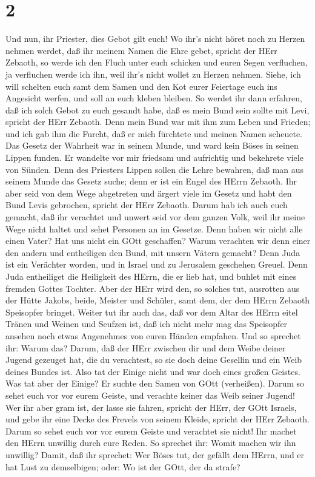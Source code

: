 \hypertarget{section-1}{%
\section{2}\label{section-1}}

 Und nun, ihr Priester, dies Gebot gilt euch! 
Wo ihr's nicht höret noch zu Herzen nehmen werdet, daß ihr meinem Namen
die Ehre gebet, spricht der HErr Zebaoth, so werde ich den Fluch unter
euch schicken und euren Segen verfluchen, ja verfluchen werde ich ihn,
weil ihr's nicht wollet zu Herzen nehmen.  Siehe, ich will
schelten euch samt dem Samen und den Kot eurer Feiertage euch ins
Angesicht werfen, und soll an euch kleben bleiben.  So
werdet ihr dann erfahren, daß ich solch Gebot zu euch gesandt habe, daß
es mein Bund sein sollte mit Levi, spricht der HErr Zebaoth.
 Denn mein Bund war mit ihm zum Leben und Frieden; und ich
gab ihm die Furcht, daß er mich fürchtete und meinen Namen scheuete.
 Das Gesetz der Wahrheit war in seinem Munde, und ward kein
Böses in seinen Lippen funden. Er wandelte vor mir friedsam und
aufrichtig und bekehrete viele von Sünden.  Denn des
Priesters Lippen sollen die Lehre bewahren, daß man aus seinem Munde das
Gesetz suche; denn er ist ein Engel des HErrn Zebaoth.  Ihr
aber seid von dem Wege abgetreten und ärgert viele im Gesetz und habt
den Bund Levis gebrochen, spricht der HErr Zebaoth.  Darum
hab ich auch euch gemacht, daß ihr verachtet und unwert seid vor dem
ganzen Volk, weil ihr meine Wege nicht haltet und sehet Personen an im
Gesetze.  Denn haben wir nicht alle einen Vater? Hat uns
nicht ein GOtt geschaffen? Warum verachten wir denn einer den andern und
entheiligen den Bund, mit unsern Vätern gemacht?  Denn Juda
ist ein Verächter worden, und in Israel und zu Jerusalem geschehen
Greuel. Denn Juda entheiliget die Heiligkeit des HErrn, die er lieb hat,
und buhlet mit eines fremden Gottes Tochter.  Aber der HErr
wird den, so solches tut, ausrotten aus der Hütte Jakobs, beide, Meister
und Schüler, samt dem, der dem HErrn Zebaoth Speisopfer bringet.
 Weiter tut ihr auch das, daß vor dem Altar des HErrn eitel
Tränen und Weinen und Seufzen ist, daß ich nicht mehr mag das Speisopfer
ansehen noch etwas Angenehmes von euren Händen empfahen. 
Und so sprechet ihr: Warum das? Darum, daß der HErr zwischen dir und dem
Weibe deiner Jugend gezeuget hat, die du verachtest, so sie doch deine
Gesellin und ein Weib deines Bundes ist.  Also tat der
Einige nicht und war doch eines großen Geistes. Was tat aber der Einige?
Er suchte den Samen von GOtt (verheißen). Darum so sehet euch vor vor
eurem Geiste, und verachte keiner das Weib seiner Jugend! 
Wer ihr aber gram ist, der lasse sie fahren, spricht der HErr, der GOtt
Israels, und gebe ihr eine Decke des Frevels von seinem Kleide, spricht
der HErr Zebaoth. Darum so sehet euch vor vor eurem Geiste und verachtet
sie nicht!  Ihr machet den HErrn unwillig durch eure Reden.
So sprechet ihr: Womit machen wir ihn unwillig? Damit, daß ihr sprechet:
Wer Böses tut, der gefällt dem HErrn, und er hat Lust zu demselbigen;
oder: Wo ist der GOtt, der da strafe?

